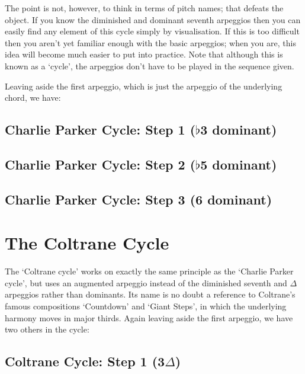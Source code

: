 \documentclass[english]{./gbook}
\begin{document}
\begin{large}
The point is not, however, to think in terms of pitch names; that defeats the object. If you know the diminished and dominant seventh arpeggios then you can easily find any element of this cycle simply by visualisation. If this is too difficult then you aren't yet familiar enough with the basic arpeggios; when you are, this idea will become much easier to put into practice. Note that although this is known as a `cycle', the arpeggios don't have to be played in the sequence given.

Leaving aside the first arpeggio, which is just the arpeggio of the underlying chord, we have:
\subsection*{Charlie Parker Cycle: Step 1 ($\flat$3 dominant)}
\subsection*{Charlie Parker Cycle: Step 2 ($\flat$5 dominant)}
\subsection*{Charlie Parker Cycle: Step 3 (6 dominant)}



\section{The Coltrane Cycle}

The `Coltrane cycle' works on exactly the same principle as the `Charlie Parker cycle', but uses an augmented arpeggio instead of the diminished seventh and $\Delta$ arpeggios rather than dominants. Its name is no doubt a reference to Coltrane's famous compositions `Countdown' and `Giant Steps', in which the underlying harmony moves in major thirds. Again leaving aside the first arpeggio, we have two others in the cycle:
\subsection*{Coltrane Cycle: Step 1 (3$\Delta$)}

\end{large}
\end{document}
